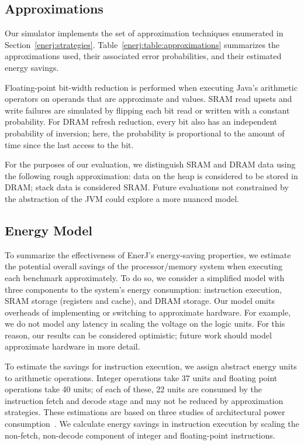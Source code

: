 \subsection{Approximations}
Our simulator implements the set of approximation techniques enumerated in
Section~\ref{enerj:strategies}. Table~\ref{enerj:table:approximations} summarizes the
approximations used, their associated error probabilities, and their
estimated energy savings.

Floating-point bit-width reduction is performed when executing Java's
arithmetic operators on operands that are approximate 
and  values. SRAM read upsets and write failures are
simulated by flipping each bit read or written with a constant
probability. For DRAM refresh reduction, every bit also has an
independent probability of inversion; here, the probability is
proportional to the amount of time since the last access to the bit.

For the purposes of our evaluation, we distinguish SRAM and DRAM data using the
following rough approximation: data on the heap is considered to be stored
in DRAM; stack data is considered SRAM\@. Future evaluations not constrained by
the abstraction of the JVM could explore a more nuanced model.

\subsection{Energy Model}
\label{enerj:energymodel}
To summarize the effectiveness of EnerJ's energy-saving properties, we estimate
the potential overall savings of the processor/memory system when executing
each benchmark approximately. To do so, we consider a simplified model with
three components to the system's energy consumption: instruction execution,
SRAM storage (registers and cache), and DRAM storage.
Our model omits overheads of implementing or switching to approximate hardware.
For example, we do not model any latency in scaling the voltage on the logic
units. For this reason, our results can be considered optimistic; future work
should model approximate hardware in more detail.

To estimate the savings for instruction execution, we assign abstract energy
units to arithmetic operations. Integer operations take 37 units and floating point
operations take 40 units; of each of these, 22 units are consumed by the
instruction fetch and decode stage and may not be reduced by approximation
strategies. These estimations are based on three studies of architectural
power consumption~\cite{mcpat,burger2003,wattch}.
We calculate energy savings in instruction execution by scaling the
non-fetch, non-decode component of integer and floating-point instructions.

